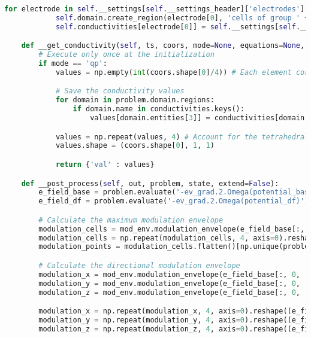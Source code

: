 \begin{lstlisting}[language=Python,caption={Class interfacing to SfePy and contains routines for the PHM and spherical model \gls{FEM} solution.},captionpos=b,label=lst:fem_solver_class]
        for electrode in self.__settings[self.__settings_header]['electrodes'][self.electrode_system].items():
            self.domain.create_region(electrode[0], 'cells of group ' + str(electrode[1]['id']))
            self.conductivities[electrode[0]] = self.__settings[self.__settings_header]['electrodes']['conductivity']

    def __get_conductivity(self, ts, coors, mode=None, equations=None, term=None, problem=None, conductivities=None):
        # Execute only once at the initialization
        if mode == 'qp':
            values = np.empty(int(coors.shape[0]/4)) # Each element corresponds to one coordinate of the respective tetrahedral edge

            # Save the conductivity values
            for domain in problem.domain.regions:
                if domain.name in conductivities.keys():
                    values[domain.entities[3]] = conductivities[domain.name]

            values = np.repeat(values, 4) # Account for the tetrahedral edges
            values.shape = (coors.shape[0], 1, 1)

            return {'val' : values}

    def __post_process(self, out, problem, state, extend=False):
        e_field_base = problem.evaluate('-ev_grad.2.Omega(potential_base)', mode='qp')
        e_field_df = problem.evaluate('-ev_grad.2.Omega(potential_df)', mode='qp')

        # Calculate the maximum modulation envelope
        modulation_cells = mod_env.modulation_envelope(e_field_base[:, 0, :, 0], e_field_df[:, 0, :, 0])
        modulation_cells = np.repeat(modulation_cells, 4, axis=0).reshape((e_field_base.shape[0], 4, 1, 1))
        modulation_points = modulation_cells.flatten()[np.unique(problem.domain.mesh.get_conn('3_4').flatten(), return_index=True)[1]]

        # Calculate the directional modulation envelope
        modulation_x = mod_env.modulation_envelope(e_field_base[:, 0, :, 0], e_field_df[:, 0, :, 0], dir_vector=[1, 0, 0])
        modulation_y = mod_env.modulation_envelope(e_field_base[:, 0, :, 0], e_field_df[:, 0, :, 0], dir_vector=[0, 1, 0])
        modulation_z = mod_env.modulation_envelope(e_field_base[:, 0, :, 0], e_field_df[:, 0, :, 0], dir_vector=[0, 0, 1])

        modulation_x = np.repeat(modulation_x, 4, axis=0).reshape((e_field_base.shape[0], 4, 1, 1))
        modulation_y = np.repeat(modulation_y, 4, axis=0).reshape((e_field_base.shape[0], 4, 1, 1))
        modulation_z = np.repeat(modulation_z, 4, axis=0).reshape((e_field_base.shape[0], 4, 1, 1))


\end{lstlisting}
